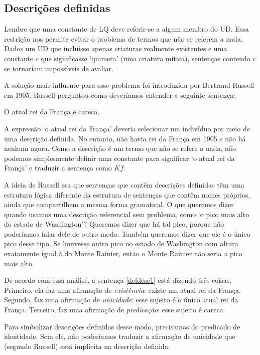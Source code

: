 \subsection{Descrições definidas}
\label{subsec.defdesc}
Lembre que uma constante de LQ deve referir-se a algum membro do UD. Essa restrição nos permite evitar o problema de termos que não se referem a nada. Dados um UD que incluísse apenas criaturas realmente existentes e uma constante $c$ que significasse `quimera' (uma criatura mítica), sentenças contendo $c$ se tornariam impossíveis de avaliar.

A solução mais influente para esse problema foi introduzida por Bertrand Russell em 1905. Russell perguntou como deveríamos entender a seguinte sentença:
\begin{earg}
\item[\ex{defdesc1}] O atual rei da França é careca.
\end{earg}
A expressão `o atual rei da França' deveria selecionar um indivíduo por meio de uma descrição definida. No entanto, não havia rei da França em 1905 e não há nenhum agora. Como a descrição é um termo que não se refere a nada, não podemos simplesmente definir uma constante para significar `o atual rei da França' e traduzir a sentença como $Kf$.

A ideia de Russell era que sentenças que contêm descrições definidas têm uma estrutura lógica diferente da estrutura de sentenças que contêm nomes próprios, ainda que compartilhem a mesma forma gramatical. O que queremos dizer quando usamos uma descrição referencial sem problema, como `o pico mais alto do estado de Washington'? Queremos dizer que há tal pico, porque não poderíamos falar dele de outro modo. Também queremos dizer que ele é o único pico desse tipo. Se houvesse outro pico no estado de Washington com altura exatamente igual à do Monte Rainier, então o Monte Rainier não seria \emph{o} pico mais alto.

De acordo com essa análise, a sentença \ref{defdesc1} está dizendo três coisas. Primeiro, ela faz uma afirmação de \emph{existência}: existe um atual rei da França. Segundo, faz uma afirmação de \emph{unicidade}: esse sujeito é o único atual rei da França. Terceiro, faz uma afirmação de \emph{predicação}: esse sujeito é careca.

Para simbolizar descrições definidas desse modo, precisamos do predicado de identidade. Sem ele, não poderíamos traduzir a afirmação de unicidade que (segundo Russell) está implícita na descrição definida.

